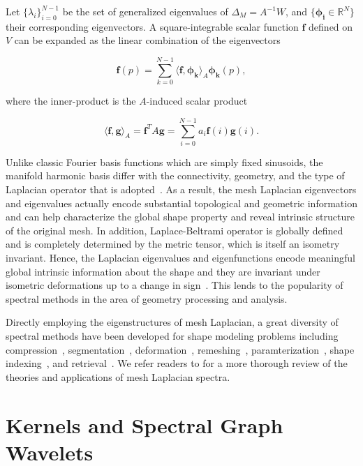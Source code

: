 Let $\{\lambda_i\}_{i=0}^{N-1}$ be the set of generalized eigenvalues of
$\Delta_M=A^{-1}W$, and $\{\mathbf{\phi_i}\in\mathbb{R}^N\}$ their corresponding
eigenvectors. A square-integrable scalar function $\mathbf{f}$ defined on $V$ can 
be expanded as the linear combination of the eigenvectors

\begin{equation}
\mathbf{f}(p)=\sum_{k=0}^{N-1}\langle \mathbf{f},\mathbf{\phi_k}\rangle_A \mathbf{\phi_k}(p),
\end{equation}

where the inner-product is the $A$-induced scalar product

\begin{equation}
\langle \mathbf{f},\mathbf{g}\rangle_A = \mathbf{f}^T A\mathbf{g}=\sum_{i=0}^{N-1}a_i \mathbf{f}(i)\mathbf{g}(i).
\end{equation}

Unlike classic Fourier basis functions which are simply fixed sinusoids, the
manifold harmonic basis differ with the connectivity, geometry, and the type 
of Laplacian operator that is adopted~\cite{Zhang:2010:CGF}. As a result, the 
mesh Laplacian eigenvectors and eigenvalues actually encode substantial topological 
and geometric information and can help characterize the global shape property and 
reveal intrinsic structure of the original mesh. In addition, Laplace-Beltrami
operator is globally defined and is completely determined by the metric tensor, 
which is itself an isometry invariant. Hence, the Laplacian eigenvalues and eigenfunctions 
encode meaningful global intrinsic information about the shape and they are invariant 
under isometric deformations up to a change in sign~\cite{Rustamov:2007:LEF,Sun:2009:CGF}.
This lends to the popularity of spectral methods in the area of geometry processing 
and analysis. 

Directly employing the eigenstructures of mesh Laplacian, a great diversity of spectral
methods have been developed for shape modeling problems including compression~\cite{Karni2000},
segmentation~\cite{Liu2007}, deformation~\cite{Rong2008}, remeshing~\cite{dong2006spectral},
paramterization~\cite{Zhou2004}, shape indexing~\cite{Reuter:2006:CAD, Rustamov:2007:LEF},
and retrieval~\cite{Lavoue:2012}. We refer readers to \cite{Zhang:2010:CGF} for a more thorough
review of the theories and applications of mesh Laplacian spectra.

\section{Kernels and Spectral Graph Wavelets}

